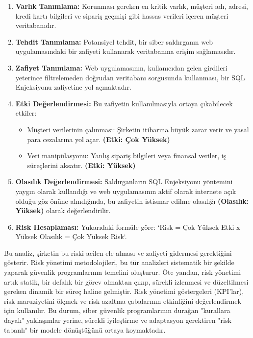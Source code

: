 \begin{enumerate}
    \item \textbf{Varlık Tanımlama:} Korunması gereken en kritik varlık, müşteri adı, adresi, kredi kartı bilgileri ve sipariş geçmişi gibi hassas verileri içeren müşteri veritabanıdır.
    \item \textbf{Tehdit Tanımlama:} Potansiyel tehdit, bir siber saldırganın web uygulamasındaki bir zafiyeti kullanarak veritabanına erişim sağlamasıdır.
    \item \textbf{Zafiyet Tanımlama:} Web uygulamasının, kullanıcıdan gelen girdileri yeterince filtrelemeden doğrudan veritabanı sorgusunda kullanması, bir SQL Enjeksiyonu zafiyetine yol açmaktadır.
    \item \textbf{Etki Değerlendirmesi:} Bu zafiyetin kullanılmasıyla ortaya çıkabilecek etkiler:
    \begin{itemize}
        \item Müşteri verilerinin çalınması: Şirketin itibarına büyük zarar verir ve yasal para cezalarına yol açar. \textbf{(Etki: Çok Yüksek)}
        \item Veri manipülasyonu: Yanlış sipariş bilgileri veya finansal veriler, iş süreçlerini aksatır. \textbf{(Etki: Yüksek)}
    \end{itemize}
    \item \textbf{Olasılık Değerlendirmesi:} Saldırganların SQL Enjeksiyonu yöntemini yaygın olarak kullandığı ve web uygulamasının aktif olarak internete açık olduğu göz önüne alındığında, bu zafiyetin istismar edilme olasılığı \textbf{(Olasılık: Yüksek)} olarak değerlendirilir.
    \item \textbf{Risk Hesaplaması:} Yukarıdaki formüle göre: `Risk = Çok Yüksek Etki x Yüksek Olasılık = Çok Yüksek Risk`.
\end{enumerate}

Bu analiz, şirketin bu riski acilen ele alması ve zafiyeti gidermesi gerektiğini gösterir. Risk yönetimi metodolojileri, bu tür analizleri sistematik bir şekilde yaparak güvenlik programlarının temelini oluşturur. Öte yandan, risk yönetimi artık statik, bir defalık bir görev olmaktan çıkıp, sürekli izlenmesi ve düzeltilmesi gereken dinamik bir süreç haline gelmiştir. Risk yönetimi göstergeleri (KPI'lar), risk maruziyetini ölçmek ve risk azaltma çabalarının etkinliğini değerlendirmek için kullanılır. Bu durum, siber güvenlik programlarının durağan "kurallara dayalı" yaklaşımlar yerine, sürekli iyileştirme ve adaptasyon gerektiren "risk tabanlı" bir modele dönüştüğünü ortaya koymaktadır.

